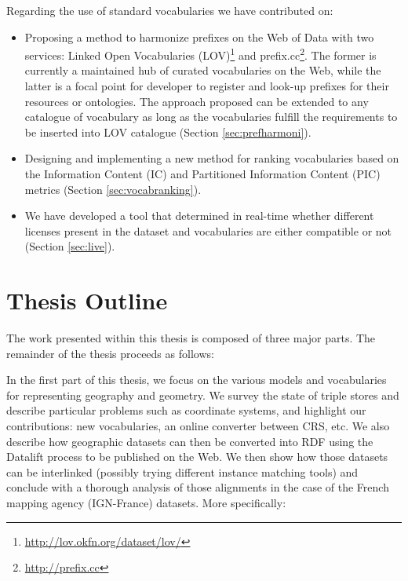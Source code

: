 Regarding the use of standard vocabularies we have contributed on: 
\begin{itemize}

\item  Proposing a method to harmonize prefixes on the Web of Data  with two services: Linked Open Vocabularies (LOV)\footnote{\url{http://lov.okfn.org/dataset/lov/}} and prefix.cc\footnote{\url{http://prefix.cc}}. The former is currently a maintained hub of curated vocabularies on the Web, while the latter is a focal point for developer to register and look-up prefixes for their resources or ontologies. The approach proposed can be extended to any catalogue of vocabulary as long as the vocabularies fulfill the requirements to be inserted into LOV catalogue (Section \ref{sec:prefharmoni}). 

\item  Designing and implementing a new method for ranking vocabularies based on the Information Content (IC) and Partitioned Information Content (PIC) metrics (Section \ref{sec:vocabranking}).

\item We have developed a tool that determined in real-time whether different licenses present in the dataset and vocabularies are either compatible or not (Section \ref{sec:live}). 
\end{itemize}

\section{Thesis Outline}
\label{sec:thesis-structure}

The work presented within this thesis is composed of three major parts. The remainder of the thesis proceeds as follows:


In the first part of this thesis, we focus on the various models and vocabularies for representing geography and geometry. We survey the state of triple stores and describe particular problems such as coordinate systems, and highlight our contributions: new vocabularies, an online converter between CRS, etc. We also describe how geographic datasets can then be converted into RDF using the Datalift process to be published on the Web. We then show how those datasets can be interlinked (possibly trying different instance matching tools) and  conclude with a thorough analysis of those alignments in the case of the French mapping agency (IGN-France) datasets. More specifically:

